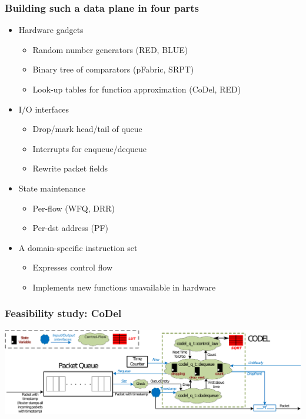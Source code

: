 \begin{Large}
\begin{frame}[plain]
\frametitle{Building such a data plane in four parts}
\begin{itemize}
\item Hardware gadgets
      \begin{itemize}
      \item Random number generators (RED, BLUE)
      \item Binary tree of comparators (pFabric, SRPT)
      \item Look-up tables for function approximation (CoDel, RED)
      \end{itemize}

\item I/O interfaces
      \begin{itemize}
      \item Drop/mark head/tail of queue
      \item Interrupts for enqueue/dequeue
      \item Rewrite packet fields
      \end{itemize}

\item State maintenance
      \begin{itemize}
      \item Per-flow (WFQ, DRR)
      \item Per-dst address (PF)
      \end{itemize}

\item A domain-specific instruction set
      \begin{itemize}
      \item Expresses control flow
      \item Implements new functions unavailable in hardware
      \end{itemize}
\end{itemize}
\end{frame}

\begin{frame}[plain]
\frametitle{Feasibility study: CoDel}
\begin{center}
\includegraphics[width=\columnwidth]{codel.pdf}
\end{center}
\end{frame}


\end{Large}
